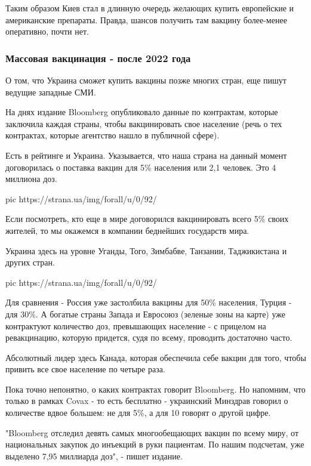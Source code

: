 Таким образом Киев стал в длинную очередь желающих купить европейские и
американские препараты. Правда, шансов получить там вакцину более-менее
оперативно, почти нет.

\subsubsection{Массовая вакцинация - после 2022 года}

О том, что Украина сможет купить вакцины позже многих стран, еще пишут ведущие
западные СМИ. 

На днях издание Bloomberg опубликовало данные по контрактам, которые заключила
каждая страны, чтобы вакцинировать свое население (речь о тех контрактах,
которые агентство нашло в публичной сфере). 

Есть в рейтинге и Украина. Указывается, что наша страна на данный момент
договорилась о поставка вакцин для 5\% населения или 2,1 человек. Это 4
миллиона доз. 

\ifcmt
pic https://strana.ua/img/forall/u/0/92/%
\fi

Если посмотреть, кто еще в мире договорился вакцинировать всего 5\% своих
жителей, то мы окажемся в компании беднейших государств мира. 

Украина здесь на уровне Уганды, Того, Зимбабве, Танзании, Таджикистана и других
стран. 

\ifcmt
pic https://strana.ua/img/forall/u/0/92/%
\fi

Для сравнения - Россия уже застолбила вакцины для 50\% населения, Турция - для
30\%. А богатые страны Запада и Евросоюз (зеленые зоны на карте) уже контрактуют
количество доз, превышающих население - с прицелом на ревакцинацию, которую
придется, судя по всему, проводить достаточно часто. 

Абсолютный лидер здесь Канада, которая обеспечила себе вакцин для того, чтобы
привить все свое население по четыре раза. 

Пока точно непонятно, о каких контрактах говорит Bloomberg. Но напомним, что
только в рамках Covax - то есть бесплатно - украинский Минздрав говорил о
количестве вдвое большем: не для 5\%, а для 10%
говорят о другой цифре. 

"Bloomberg отследил девять самых многообещающих вакцин по всему миру, от
национальных закупок до инъекций в руки пациентам. По нашим подсчетам, уже
выделено 7,95 миллиарда доз", - пишет издание. 

